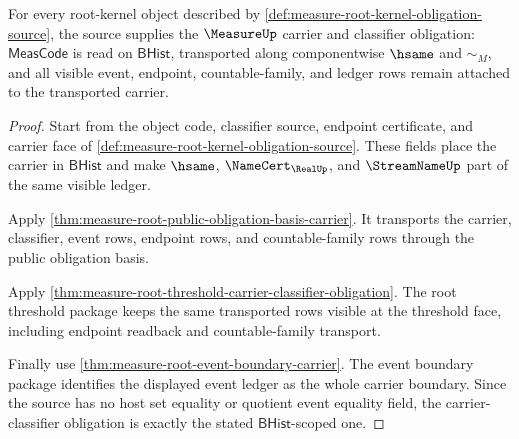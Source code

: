 \begin{theorem}
\label{thm:measure-root-kernel-carrier-classifier-obligation}
For every root-kernel object described by
\autoref{def:measure-root-kernel-obligation-source}, the source supplies the
$\MeasureUp$ carrier and classifier obligation: $\mathsf{MeasCode}$ is read
on $\mathsf{BHist}$, transported along componentwise $\hsame$ and $\sim_M$,
and all visible event, endpoint, countable-family, and ledger rows remain
attached to the transported carrier.
\end{theorem}
\begin{proof}
Start from the object code, classifier source, endpoint certificate, and
carrier face of \autoref{def:measure-root-kernel-obligation-source}. These
fields place the carrier in $\mathsf{BHist}$ and make $\hsame$,
$\NameCert_{\RealUp}$, and $\StreamNameUp$ part of the same visible ledger.

Apply \autoref{thm:measure-root-public-obligation-basis-carrier}. It
transports the carrier, classifier, event rows, endpoint rows, and
countable-family rows through the public obligation basis.

Apply \autoref{thm:measure-root-threshold-carrier-classifier-obligation}.
The root threshold package keeps the same transported rows visible at the
threshold face, including endpoint readback and countable-family transport.

Finally use \autoref{thm:measure-root-event-boundary-carrier}. The event
boundary package identifies the displayed event ledger as the whole carrier
boundary. Since the source has no host set equality or quotient event
equality field, the carrier-classifier obligation is exactly the stated
$\mathsf{BHist}$-scoped one.
\end{proof}

